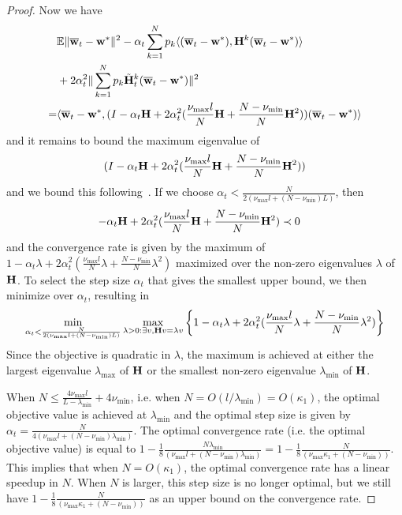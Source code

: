 \begin{proof}
	Now we have 
	\begin{align*}
	& \mathbb{E}\|{\overline{\mathbf{w}}}_{t}-{\mathbf{w}}^{\ast}\|^{2}-\alpha_{t}\sum_{k=1}^{N}p_{k}\langle({\overline{\mathbf{w}}}_{t}-{\mathbf{w}}^{\ast}),{\mathbf{H}}^{k}({\overline{\mathbf{w}}}_{t}-{\mathbf{w}}^{\ast})\rangle\\
	&+2\alpha_{t}^{2}\|\sum_{k=1}^{N}p_{k}\tilde{{\mathbf{H}}}_{t}^{k}({\overline{\mathbf{w}}}_{t}-{\mathbf{w}}^{\ast})\|^{2} \\
	= &\langle{\overline{\mathbf{w}}}_{t}-{\mathbf{w}}^{\ast},(I-\alpha_{t}{\mathbf{H}}+2\alpha_{t}^{2}(\frac{\nu_{\max}l}{N}{\mathbf{H}}+\frac{N-\nu_{\min}}{N}{\mathbf{H}}^{2}))({\overline{\mathbf{w}}}_{t}-{\mathbf{w}}^{\ast})\rangle
	\end{align*}
	and it remains to bound the maximum eigenvalue of 
	\begin{align*}
	(I-\alpha_{t}{\mathbf{H}}+2\alpha_{t}^{2}(\frac{\nu_{\max}l}{N}{\mathbf{H}}+\frac{N-\nu_{\min}}{N}{\mathbf{H}}^{2}))
	\end{align*}
	and we bound this following~\cite{ma2017power}. If we choose $\alpha_{t}<\frac{N}{2(\nu_{\max}l+(N-\nu_{\min})L)}$,
	then 
	\begin{align*}
	-\alpha_{t}{\mathbf{H}}+2\alpha_{t}^{2}(\frac{\nu_{\max}l}{N}{\mathbf{H}}+\frac{N-\nu_{\min}}{N}{\mathbf{H}}^{2}) & \prec0
	\end{align*}
	and the convergence rate is given by the maximum of $1-\alpha_{t}\lambda+2\alpha_{t}^{2}(\frac{\nu_{\max}l}{N}\lambda+\frac{N-\nu_{\min}}{N}\lambda^{2})$
	maximized over the non-zero eigenvalues $\lambda$ of ${\mathbf{H}}$. To select
	the step size $\alpha_{t}$ that gives the smallest upper bound, we
	then minimize over $\alpha_{t}$, resulting in 
	{\tiny
	\begin{align*}
	\min_{\alpha_{t}<\frac{N}{2(\nu_{\max}l+(N-\nu_{\min})L)}}\max_{\lambda>0:\exists v,{\mathbf{H}} v=\lambda v}\left\{ 1-\alpha_{t}\lambda+2\alpha_{t}^{2}(\frac{\nu_{\max}l}{N}\lambda+\frac{N-\nu_{\min}}{N}\lambda^{2})\right\} 
	\end{align*}}%
	Since the objective is quadratic in $\lambda$, the maximum is achieved
	at either the largest eigenvalue $\lambda_{\max}$ of ${\mathbf{H}}$ or the
	smallest non-zero eigenvalue $\lambda_{\min}$ of ${\mathbf{H}}$. 
	
	When $N\leq\frac{4\nu_{\max}l}{L-\lambda_{\min}}+4\nu_{\min}$, i.e.
	when $N=O(l/\lambda_{\min})=O(\kappa_{1})$, the optimal objective
	value is achieved at $\lambda_{\min}$ and the optimal step size is
	given by $\alpha_{t}=\frac{N}{4(\nu_{\max}l+(N-\nu_{\min})\lambda_{\min})}$.
	The optimal convergence rate (i.e. the optimal objective value) is
	equal to $1-\frac{1}{8}\frac{N\lambda_{\min}}{(\nu_{\max}l+(N-\nu_{\min})\lambda_{\min})}=1-\frac{1}{8}\frac{N}{(\nu_{\max}\kappa_{1}+(N-\nu_{\min}))}$.
	This implies that when $N=O(\kappa_{1})$, the optimal convergence
	rate has a linear speedup in $N$. When $N$ is larger, this step
	size is no longer optimal, but we still have $1-\frac{1}{8}\frac{N}{(\nu_{\max}\kappa_{1}+(N-\nu_{\min}))}$
	as an upper bound on the convergence rate. 
	

\end{proof}
